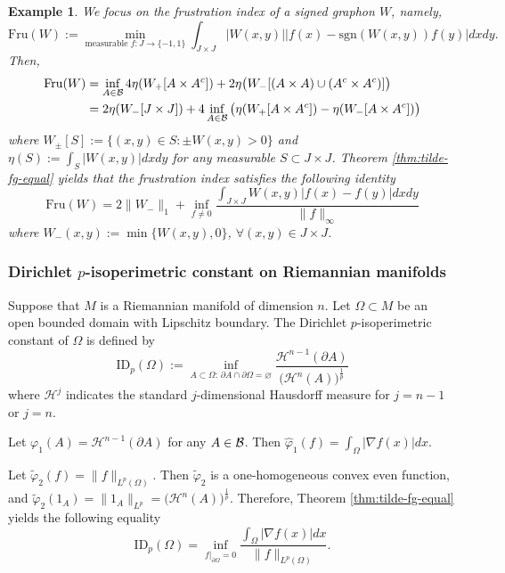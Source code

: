 \documentclass[12pt,a4paper]{article}
\newtheorem{example}[theorem]{Example}
\begin{document}
\begin{example}%
\label{example:frustration}
We focus on the \emph{frustration index} of a signed graphon $W$, namely,
$$\mathrm{Fru}(W):=\min_{\text{measurable }f:J\to \{-1,1\}}\int_{J\times J}|W(x,y)|\big|f(x)-\mathrm{sgn}(W(x,y))f(y)\big|dxdy.$$
Then, \begin{align*}
 \mathrm{Fru}(W)&=\inf_{A\in \mathcal{B}}4\eta(W_+[A\times A^c])+2\eta \big(W_-[(A\times A)\cup(A^c\times A^c)]\big)   
 \\&=2\eta(W_-[J\times J])+4\inf_{A\in \mathcal{B}}\big(\eta(W_+[A\times A^c])-\eta(W_-[A\times A^c])\big)
\end{align*}
where $W_\pm[S]:=\{(x,y)\in S:\pm W(x,y)>0\}$ and   $\eta(S):=\int_S|W(x,y)|dxdy$ for any measurable $S\subset J\times J$. Theorem \ref{thm:tilde-fg-equal} yields that the frustration index satisfies the following identity
$$ \mathrm{Fru}(W)=2\|W_-\|_1+\inf\limits_{f\ne0}\frac{\int_{J\times J}W(x,y)|f(x)-f(y)|dxdy}{\|f\|_\infty}$$
where $W_-(x,y):=\min\{W(x,y),0\}$, $\forall (x,y)\in J\times J$.
\end{example}

\subsubsection{Dirichlet $p$-isoperimetric constant on Riemannian manifolds}

Suppose that $M$ is a Riemannian manifold of dimension $n$. 
Let $\Omega\subset M$ be an open bounded domain with Lipschitz boundary. The  Dirichlet $p$-isoperimetric constant of $\Omega$ is defined by 
$$\mathrm{ID}_p(\Omega):=\inf_{A\subset \Omega:\,\partial A\cap\partial \Omega=\varnothing}\frac{\mathcal{H}^{n-1}(\partial A)}{\big(\mathcal{H}^{n}( A)\big)^{\frac1p}}$$
where $\mathcal{H}^{j}$ indicates the standard $j$-dimensional Hausdorff measure for $j=n-1$ or $j=n$.  

Let $\varphi_1(A)=\mathcal{H}^{n-1}(\partial A)$ for any $A\in\mathcal{B}$. Then $\widehat{\varphi}_1(f)=\int_\Omega|\nabla f(x)|dx$. 

Let $\widetilde{\varphi}_2(f)=\|f\|_{L^p(\Omega)}$. Then $\widetilde{\varphi}_2$ is a one-homogeneous convex even function, and $\widetilde{\varphi}_2(1_A)=\|1_A\|_{L^p}=\big(\mathcal{H}^{n}(A)\big)^{\frac1p}$. Therefore, Theorem \ref{thm:tilde-fg-equal} yields the following equality 
$$\mathrm{ID}_p(\Omega)=\inf_{f|_{\partial \Omega}=0}\frac{\int_\Omega|\nabla f(x)|dx}{\|f\|_{L^p(\Omega)}}.$$
\end{document}
